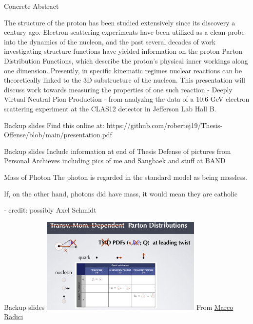 \documentclass[aspectratio=169]{beamer}
\begin{document}
\begin{frame}{Concrete Abstract}

The structure of the proton has been studied extensively since its discovery a century ago.  Electron scattering experiments have been utilized as a clean probe into the dynamics of the nucleon, and the past several decades of work investigating structure functions have yielded information on the proton Parton Distribution Functions, which describe the proton's physical inner workings along one dimension. Presently, in specific kinematic regimes nuclear reactions can be theoretically linked to the 3D substructure of the nucleon. This presentation will discuss work towards measuring the properties of one such reaction - Deeply Virtual Neutral Pion Production - from analyzing the data of a 10.6 GeV electron scattering experiment at the CLAS12 detector in Jefferson Lab Hall B. 

\end{frame}


\begin{frame}{Backup slides}
\centering
    Find this online at: https://github.com/robertej19/Thesis-Offense/blob/main/presentation.pdf
\end{frame}

\begin{frame}{Backup slides}
\centering
    Include information at end of Thesis Defense of pictures from Personal Archieves including pics of me and Sangbaek and stuff at BAND
\end{frame}

\begin{frame}{Mass of Photon}
\centering
The photon is regarded in the standard model as being massless.

If, on the other hand, photons did have mass, it would mean they are catholic 

- credit: possibly Axel Schmidt
\end{frame}


\begin{frame}{Backup slides}
\centering
\includegraphics[width=0.6\textwidth]{backup/pdf_lead_twist.png}
From \href{https://indico.cern.ch/event/797767/contributions/3682622/attachments/1965784/3268756/6_radici.pdf}{Marco Radici}
\end{frame}
\end{document}
